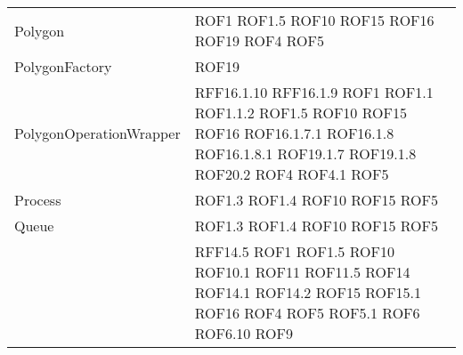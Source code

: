 \begin{longtable}{p{5cm}!{\VRule[1pt]}p{2.5cm}}
		Polygon & ROF1 \newline ROF1.5 \newline ROF10 \newline ROF15 \newline ROF16 \newline ROF19 \newline ROF4 \newline ROF5\\
		PolygonFactory & ROF19\\
		PolygonOperationWrapper & RFF16.1.10 \newline RFF16.1.9 \newline ROF1 \newline ROF1.1 \newline ROF1.1.2 \newline ROF1.5 \newline ROF10 \newline ROF15 \newline ROF16 \newline ROF16.1.7.1 \newline ROF16.1.8 \newline ROF16.1.8.1 \newline ROF19.1.7 \newline ROF19.1.8 \newline ROF20.2 \newline ROF4 \newline ROF4.1 \newline ROF5\\
		Process & ROF1.3 \newline ROF1.4 \newline ROF10 \newline ROF15 \newline ROF5\\
		Queue & ROF1.3 \newline ROF1.4 \newline ROF10 \newline ROF15 \newline ROF5\\
		 & RFF14.5 \newline ROF1 \newline ROF1.5 \newline ROF10 \newline ROF10.1 \newline ROF11 \newline ROF11.5 \newline ROF14 \newline ROF14.1 \newline ROF14.2 \newline ROF15 \newline ROF15.1 \newline ROF16 \newline ROF4 \newline ROF5 \newline ROF5.1 \newline ROF6 \newline ROF6.10 \newline ROF9\\

\end{longtable}

